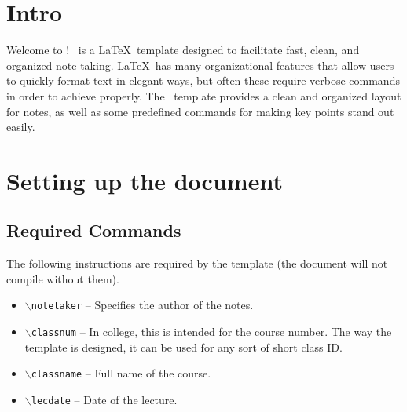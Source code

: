 \documentclass{ClassTeX}
\begin{document}
	\maketitle
	\section{Intro}
	Welcome to \ClassTeX!  \ClassTeX\ is a \LaTeX\ template designed to facilitate fast, clean, and organized note-taking.  \LaTeX\ has many organizational features that allow users to quickly format text in elegant ways, but often these require verbose commands in order to achieve properly.  The \ClassTeX\ template provides a clean and organized layout for notes, as well as some predefined commands for making key points stand out easily.
	
	\section{Setting up the document}
	
	\subsection{Required Commands}
	The following instructions are required by the template (the document will not compile without them).
	\begin{itemize}
		\item \texttt{$\backslash$notetaker} -- Specifies the author of the notes.
		\item \texttt{$\backslash$classnum} -- In college, this is intended for the course number.  The way the template is designed, it can be used for any sort of short class ID.
		\item \texttt{$\backslash$classname} -- Full name of the course.
		\item \texttt{$\backslash$lecdate} -- Date of the lecture.
	\end{itemize}
	
\end{document}
